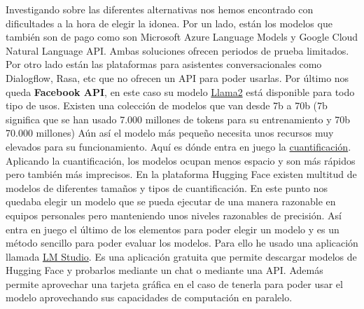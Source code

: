 Investigando sobre las diferentes alternativas nos hemos encontrado con dificultades a la hora de elegir la idonea.
Por un lado, están los modelos que también son de pago como son Microsoft Azure Language Models y Google Cloud Natural Language API. Ambas soluciones ofrecen periodos de prueba limitados.
Por otro lado están las plataformas para asistentes conversacionales como Dialogflow, Rasa, etc que no ofrecen un API para poder usarlas.
Por último nos queda \textbf{Facebook API}, en este caso su modelo \href{https://github.com/facebookresearch/llama}{Llama2} está disponible para todo tipo de usos.
Existen una colección de modelos que van desde 7b a 70b (7b significa que se han usado 7.000 millones de tokens para su entrenamiento y 70b 70.000 millones)
Aún así el modelo más pequeño necesita unos recursos muy elevados para su funcionamiento. Aquí es dónde entra en juego la \href{https://es.wikipedia.org/wiki/Cuantificaci%C3%B3n_digital}{cuantificación}.
Aplicando la cuantificación, los modelos ocupan menos espacio y son más rápidos pero también más imprecisos.
En la plataforma Hugging Face existen multitud de modelos de diferentes tamaños y tipos de cuantificación.
En este punto nos quedaba elegir un modelo que se pueda ejecutar de una manera razonable en equipos personales pero manteniendo unos niveles razonables de precisión.
Así entra en juego el último de los elementos para poder elegir un modelo y es un método sencillo para poder evaluar los modelos.
Para ello he usado una aplicación llamada \href{https://lmstudio.ai/}{LM Studio}. Es una aplicación gratuita que permite descargar modelos de Hugging Face y probarlos mediante un chat o mediante una API.
Además permite aprovechar una tarjeta gráfica en el caso de tenerla para poder usar el modelo aprovechando sus capacidades de computación en paralelo.

